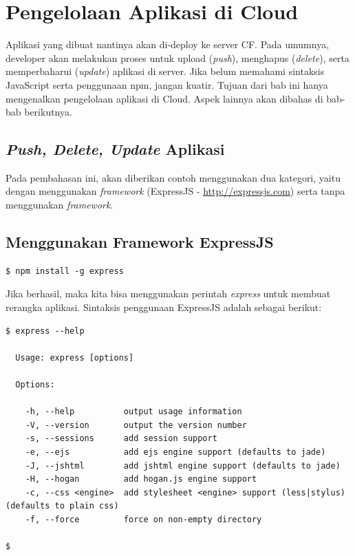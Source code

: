 \section{Pengelolaan Aplikasi di Cloud}

Aplikasi yang dibuat nantinya akan di-deploy ke server CF. Pada umumnya, developer akan melakukan proses untuk upload (\textit{push}), menghapus (\textit{delete}), serta memperbaharui (\textit{update}) aplikasi di server. Jika belum memahami sintaksis JavaScript serta penggunaan npm, jangan kuatir. Tujuan dari bab ini hanya mengenalkan pengelolaan aplikasi di Cloud. Aspek lainnya akan dibahas di bab-bab berikutnya.

\subsection{\textit{Push, Delete, Update} Aplikasi}

Pada pembahasan ini, akan diberikan contoh menggunakan dua kategori, yaitu dengan menggunakan \textit{framework} (ExpressJS - \url{http://expressjs.com}) serta tanpa menggunakan \textit{framework}.

\subsection{Menggunakan Framework ExpressJS}

\lstset{language=bash,caption=Instalasi ExpressJS menggunakan npm}
\begin{lstlisting}
$ npm install -g express
\end{lstlisting}

Jika berhasil, maka kita bisa menggunakan perintah \textit{express} untuk membuat rerangka aplikasi. Sintaksis penggunaan ExpressJS adalah sebagai berikut:

\lstset{language=bash,caption=Perintah express}
\begin{lstlisting}
$ express --help

  Usage: express [options]

  Options:

    -h, --help          output usage information
    -V, --version       output the version number
    -s, --sessions      add session support
    -e, --ejs           add ejs engine support (defaults to jade)
    -J, --jshtml        add jshtml engine support (defaults to jade)
    -H, --hogan         add hogan.js engine support
    -c, --css <engine>  add stylesheet <engine> support (less|stylus) (defaults to plain css)
    -f, --force         force on non-empty directory

$
\end{lstlisting}


